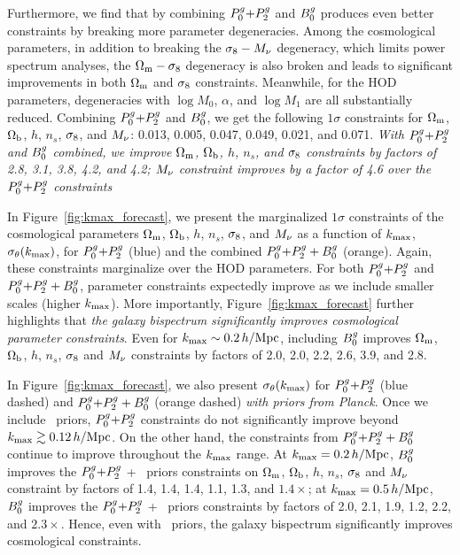 Furthermore, we find that by combining $P^g_0{+}P^g_2$ and $B^g_0$ produces even better
constraints by breaking more parameter degeneracies. Among the cosmological 
parameters, in addition to breaking the $\sigma_8 - M_\nu$ degeneracy, which limits
power spectrum analyses, the $\Omega_{\rm m}-\sigma_8$ degeneracy is also broken and leads to
significant improvements in both $\Omega_{\rm m}$ and 
$\sigma_8$ constraints. Meanwhile, for the HOD parameters, degeneracies with 
$\log M_0$, $\alpha$, and $\log M_1$ are all substantially reduced. 
Combining $P^g_0{+}P^g_2$ and $B^g_0$, we get the following $1\sigma$ constraints for 
 $\Omega_{\rm m}$, $\Omega_{\rm b}$, $h$, $n_s$, $\sigma_8$, and $M_\nu$: 
0.013, 0.005, 0.047, 0.049, 0.021, and 0.071.
{\em With $P^g_0{+}P^g_2$ and $B^g_0$ combined, we improve $\Omega_{\rm m}$, $\Omega_{\rm b}$, $h$,
$n_s$, and $\sigma_8$ constraints by factors of 2.8, 3.1, 3.8, 4.2, and 4.2;
$M_\nu$ constraint improves by a factor of 4.6 over the $P^g_0{+}P^g_2$ constraints}

In Figure~\ref{fig:kmax_forecast}, we present the marginalized $1\sigma$
constraints of the cosmological parameters $\Omega_{\rm m}$, $\Omega_{\rm b}$, $h$, $n_s$, $\sigma_8$, 
and $M_\nu$ as a function of $k_{\rm max}$, $\sigma_\theta(k_{\rm max})$, for $P^g_0{+}P^g_2$
(blue) and the combined $P^g_0{+}P^g_2 + B^g_0$ (orange). Again, these constraints
marginalize over the \cite{zheng2007} HOD parameters. For both $P^g_0{+}P^g_2$ and
$P^g_0{+}P^g_2 + B^g_0$, parameter constraints expectedly improve as
we include smaller scales (higher $k_{\rm max}$). More importantly,
Figure~\ref{fig:kmax_forecast} further highlights that {\em the galaxy bispectrum
significantly improves cosmological parameter constraints}. Even for 
$k_{\rm max}\sim 0.2\,h/\mathrm{Mpc}$, including 
$B^g_0$ improves $\Omega_{\rm m}$, $\Omega_{\rm b}$, $h$, $n_s$, $\sigma_8$ and $M_\nu$ constraints by 
factors of 2.0, 2.0, 2.2, 2.6, 3.9, and 2.8.

In Figure~\ref{fig:kmax_forecast}, we also present $\sigma_\theta(k_{\rm max})$ for
$P^g_0{+}P^g_2$ (blue dashed) and $P^g_0{+}P^g_2 + B^g_0$ 
(orange dashed) {\em with priors from Planck}. Once we include \planck~priors,
$P^g_0{+}P^g_2$ constraints do not significantly improve beyond $k_{\rm max} \gtrsim 0.12\,h/\mathrm{Mpc}$.
On the other hand, the constraints from $P^g_0{+}P^g_2 + B^g_0$ continue to improve 
throughout the $k_{\rm max}$ range. 
At $k_{\rm max}=0.2\,h/\mathrm{Mpc}$, $B^g_0$ improves the $P^g_0{+}P^g_2$ + \planck~priors constraints on  
$\Omega_{\rm m}$, $\Omega_{\rm b}$, $h$, $n_s$, $\sigma_8$ and $M_\nu$ constraint by factors of
1.4, 1.4, 1.4, 1.1, 1.3, and $1.4\times$;
at $k_{\rm max} = 0.5\,h/\mathrm{Mpc}$, $B^g_0$ improves the $P^g_0{+}P^g_2$ + \planck~priors constraints 
by factors of 2.0, 2.1, 1.9, 1.2, 2.2, and $2.3\times$. Hence, even with 
\planck~priors, the galaxy bispectrum significantly improves cosmological 
constraints. 


